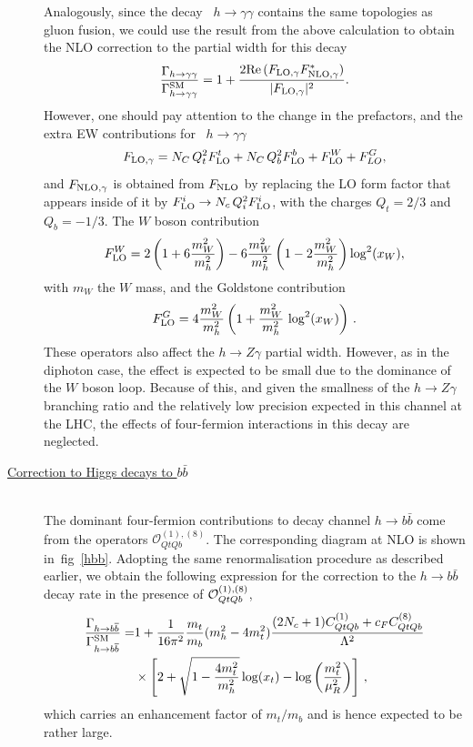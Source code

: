 \begin{description}
		Analogously, since the decay ~$ h \to \gamma \gamma$ contains the same topologies as gluon fusion, we could use the result from the above calculation to obtain the NLO correction to the partial width for this decay
		\begin{equation}
			\frac{\Gamma_{h\to \gamma\gamma}}{\Gamma_{h\to \gamma\gamma}^{\mathrm{SM}}}= 1+ \frac{2 \mbox{Re}\,(F_{\textrm{LO}, \gamma} F^*_{\textrm{NLO},\gamma})}{  |F_{\textrm{LO}, \gamma}|^2} .
		\end{equation}
		However, one should pay attention to the change in the prefactors, and the extra EW contributions for ~$ h \to \gamma \gamma$ 
		\begin{equation}
			F_{\textrm{LO}, \gamma}= N_C\,Q_t^2 F_{\textrm{LO}}^t+ N_C\,Q_b^2 F_{\textrm{LO}}^b+F_{\textrm{LO}}^W+ F^G_{LO} ,
		\end{equation}
		and $F_{\textrm{NLO}, \gamma}$ is obtained from $F_{\textrm{NLO}}$ by replacing the LO form factor that appears inside of it by  $ F_{\textrm{LO}}^i \to N_c \,Q_i^2 F_{\textrm{LO}}^i$,
		with the charges $Q_t=2/3$ and $Q_b=-1/3$. The $W$ boson contribution
		\begin{equation}
			F_{\textrm{LO}}^W= 2 \left(1+6 \frac{m_W^2}{m_h^2}\right)-6 \frac{m_W^2}{  m_h^2} \left(1-2  \frac{m_W^2}{m_h^2}\right) \log^2(x_W),
		\end{equation}
		with $m_W$ the $W$ mass, and the Goldstone contribution
		\begin{equation}
			F_{\textrm{LO}}^G=4\frac{m_W^2}{m_h^2} \left( 1+ \frac{m_W^2}{m_h^2} \,\log^2(x_W) \right)\,.
		\end{equation}
		These operators also affect the $h\to Z\gamma$ partial width. However, as in the diphoton case, the effect is expected to be small due to the dominance of the $W$ boson loop. Because of this, and given the smallness of the $h\to Z\gamma$ branching ratio and the relatively low precision expected in this channel at the LHC, the effects of four-fermion interactions in this decay are neglected.
		\item [\underline{Correction to Higgs decays to $b \bar{b}$ }] \hfill  \vspace{0.3cm} \\
		The dominant four-fermion contributions to decay channel $h \to b\bar b$ come from the operators  $\mathcal{O}_{QtQb}^{(1),(8)}$. The corresponding diagram at NLO is shown in~fig~\ref{hbb}. 
		Adopting the same renormalisation procedure as described earlier, we obtain the following expression for the correction to 
		the $h \to b\bar b$ decay rate in the presence of ${\cal O}_{QtQb}^{(1),(8)}$,
		\begin{equation}
			\begin{split}
				\frac{\Gamma_{h\to b\overline{b}}}{\Gamma_{h\to b\overline{b}}^{\mathrm{SM}}}=& 1+ \frac{1}{16\pi^2}\frac{m_t}{m_b}(m_h^2-4m_t^2)\frac{(2 N_c+1) C_{QtQb}^{(1)}+c_F C_{QtQb}^{(8)}}{\Lambda^2} \\ & \times\left[ 2+\sqrt{1-\frac{4 m_t^2}{m_h^2}}\log(x_t)-\log\left(\frac{m_t^2}{\mu_R^2}\right) \right] \,,
				\label{hbbnlo}
			\end{split}
		\end{equation}
		which carries an enhancement factor of $m_t/m_b$ and is hence expected to be rather large.
	\end{description}
